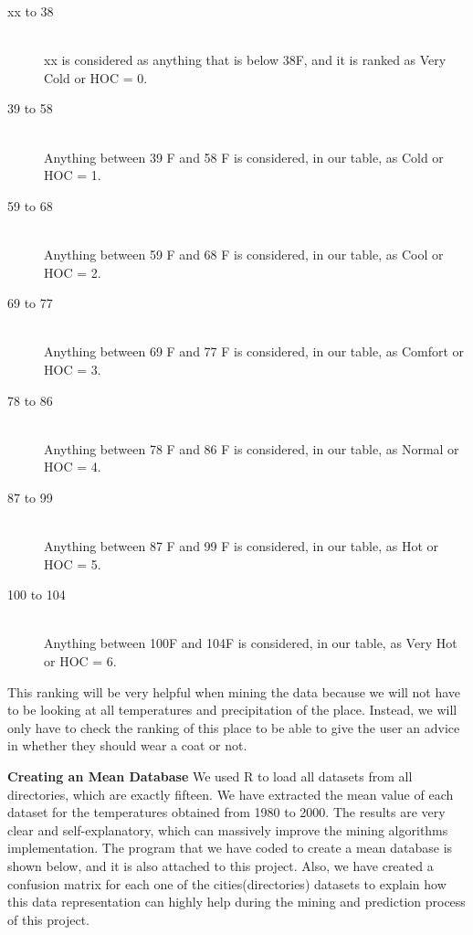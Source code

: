 \documentclass{sig-alternate}
\begin{document}
\begin{description}
						\begin{description}
  							\item[xx   to   38] \hfill \\
  								xx is considered as anything that is below 38F, and it is ranked as 										Very Cold or HOC = 0.
  							\item[39   to   58 ] \hfill \\
  								Anything between 39  F and 58  F is considered, in our table, as Cold 									or HOC = 1.
  							\item[59   to   68] \hfill \\
  								Anything between 59  F and 68  F is considered, in our table, as Cool 									or HOC = 2.
  							\item[69   to   77] \hfill \\
  								Anything between 69  F and 77  F is considered, in our table, as 											Comfort or HOC = 3.
  							\item[78   to   86] \hfill \\
  								Anything between 78  F and 86  F is considered, in our table, as Normal  								or HOC = 4.
   							\item[87   to   99] \hfill \\
  								Anything between 87  F and 99  F is considered, in our table, as Hot or 								HOC = 5.
  							\item[100 to 104] \hfill \\
  								Anything between 100F and 104F is considered, in our table, as Very Hot 								or HOC = 6.	
						\end{description}						

						This ranking will be very helpful when mining the data because we will not have 						to be looking at all temperatures and precipitation of the place. Instead, we 							will only have to check the ranking of this place to be able to give the user 							an advice in whether they should wear a coat or not.\newline

						\textbf{Creating an Mean Database}\newline
							We used R to load all datasets from all directories, which are exactly 									fifteen. We have extracted the mean value of each dataset for the 										temperatures obtained from 1980 to 2000. The results are very clear and 									self-explanatory, which can 	massively improve the mining algorithms 										implementation. The program that we 	have coded to create a mean database is 							shown below, and it is also attached to 	this project.  Also, we have 									created a confusion matrix for each one of the cities(directories) datasets 							to explain how this data representation can highly help during the mining 								and prediction process of this project. \newline


\end{description}
\end{document}
